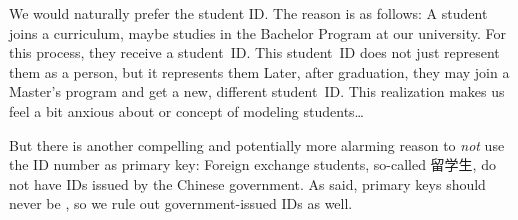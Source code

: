 We would naturally prefer the student ID.
The reason is as follows:
A student joins a curriculum, maybe studies in the Bachelor Program  at our university.
For this process, they receive a student~ID.
This student~ID does not just represent them as a person, but it represents them 
Later, after graduation, they may join a Master's program and get a new, different student~ID.
This realization makes us feel a bit anxious about or concept of modeling students\dots

But there is another compelling and potentially more alarming reason to \emph{not} use the ID number as primary key:
Foreign exchange students, so-called 留学生, do not have IDs issued by the Chinese government.
As said, primary keys should never be , so we rule out government-issued IDs as well.

